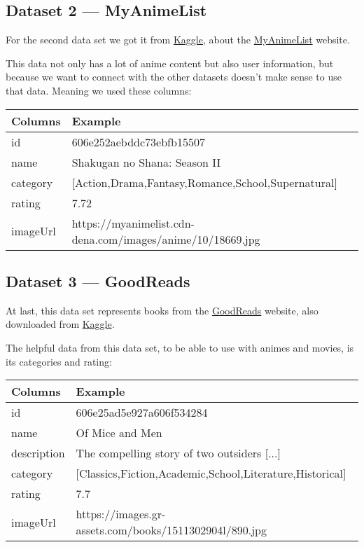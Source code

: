 \documentclass{article}
\newcommand*\fpar{\hspace{1ex}}
\begin{document}
  \subsection{Dataset 2 — MyAnimeList}
  \label{sec:anime}
  \fpar For the second data set we got it from \href{https://www.kaggle.com/azathoth42/myanimelist}{Kaggle}, about the \href{https://myanimelist.net/}{MyAnimeList} website.
  \par This data not only has a lot of anime content but also user information, but because we want to connect with the other datasets doesn't make sense to use that data. Meaning we used these columns:
  \begin{table}[H]
    \centering
    \begin{tabular}{l|l}
      Columns & Example                       \\ \hline
      id      & 606e252aebddc73ebfb15507      \\
      name    & Shakugan no Shana: Season II  \\
      category& [Action,Drama,Fantasy,Romance,School,Supernatural]  \\
      rating  & 7.72                          \\
      imageUrl& https://myanimelist.cdn-dena.com/images/anime/10/18669.jpg
    \end{tabular}
  \end{table}

  \subsection{Dataset 3 — GoodReads}
  \label{sec:reads}
  \fpar At last, this data set represents books from the \href{https://www.goodreads.com/}{GoodReads} website, also downloaded from \href{https://www.kaggle.com/meetnaren/goodreads-best-books}{Kaggle}.
  \par The helpful data from this data set, to be able to use with animes and movies, is its categories and rating:
  \begin{table}[H]
    \centering
    \begin{tabular}{l|l}
      Columns & Example                       \\ \hline
      id      & 606e25ad5e927a606f534284      \\
      name    & Of Mice and Men               \\
      description & The compelling story of two outsiders [...]           \\
      category& [Classics,Fiction,Academic,School,Literature,Historical]  \\
      rating  & 7.7                           \\
      imageUrl& https://images.gr-assets.com/books/1511302904l/890.jpg
    \end{tabular}
  \end{table}
\end{document}
